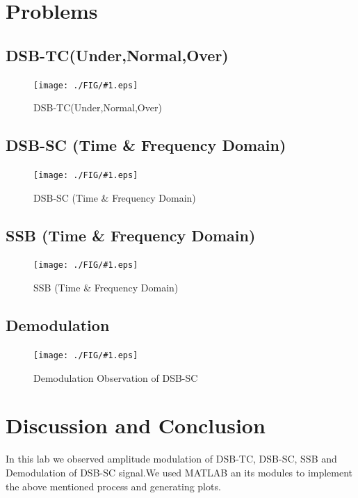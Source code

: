 \documentclass[a4paper,11pt]{article}
\newcommand{\mobs}[2]{
    \begin{figure}[H]
        \centering
        \texttt{[image: ./FIG/\#1.eps]}
        \caption{#2}
    \end{figure}
   
}
\begin{document}
\section{Problems}
\subsection{DSB-TC(Under,Normal,Over)}

\mobs{dsbtc}{DSB-TC(Under,Normal,Over)}


\subsection{DSB-SC (Time \& Frequency Domain)}
\mobs{dsbsc}{DSB-SC (Time \& Frequency Domain)}


\pagebreak
\subsection{SSB (Time \& Frequency Domain)}

\mobs{ssb}{SSB (Time \& Frequency Domain)}

\pagebreak
\subsection{Demodulation}
\mobs{demod}{Demodulation Observation of DSB-SC}

\section{Discussion and Conclusion}
In this lab we observed amplitude modulation of DSB-TC, DSB-SC, SSB and Demodulation of DSB-SC signal.We used MATLAB an its modules to implement the above mentioned process and generating plots.
\end{document}

